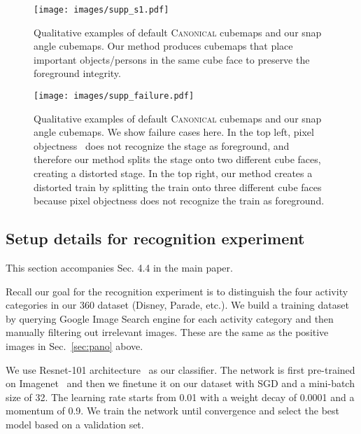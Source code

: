 \begin{figure*}[t]
\centering
\renewcommand{\tabcolsep}{0pt}
\texttt{[image: images/supp\_s1.pdf]}%
\vspace{-10pt}
\caption{Qualitative examples of default \textsc{Canonical} cubemaps and our snap angle cubemaps.  Our method produces cubemaps that place important objects/persons in the same cube face to preserve the foreground integrity.}
\label{fig:supp_qual1}
\end{figure*}








\begin{figure*}[t]
\centering
\renewcommand{\tabcolsep}{0pt}
\texttt{[image: images/supp\_failure.pdf]}%
\caption{Qualitative examples of default \textsc{Canonical} cubemaps and our snap angle cubemaps. We show failure cases here. In the top left, pixel objectness~\cite{jain2017pixel} does not recognize the stage as foreground, and therefore our method splits the stage onto two different cube faces, creating a distorted stage. In the top right, our method creates a distorted train by
splitting the train onto three different cube faces because pixel objectness does not recognize the train as foreground.}
\label{fig:supp_qual3}
\end{figure*}


\subsection{Setup details for recognition experiment}

This section accompanies Sec. 4.4 in the main paper.

Recall our goal for the recognition experiment is to distinguish the four activity categories in our 360 dataset (Disney, Parade, etc.). We build a training dataset by querying Google Image Search engine for each activity category and then manually filtering out irrelevant images.  These are the same as the positive images in Sec.~\ref{sec:pano} above.

We use Resnet-101 architecture~\cite{he2016deep} as our classifier. The network is first pre-trained on Imagenet~\cite{russakovsky2015imagenet} and then we finetune
 it on our dataset with SGD and a mini-batch size of 32. The learning rate starts from 0.01 with a weight decay of 0.0001 and a momentum of 0.9. We train the network 
until convergence and select the best model based on a validation set.



